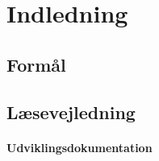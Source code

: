 \chapter{Indledning}
\section{Formål}

\section{Læsevejledning}

\subsubsection{Udviklingsdokumentation}

